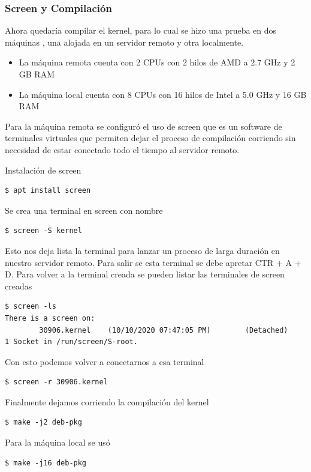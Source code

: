 \documentclass[12pt]{article}
\begin{document}
\subsubsection{Screen y Compilación}
Ahora quedaría compilar el kernel, para lo cual se hizo una prueba en dos máquinas , una alojada en un servidor remoto y otra localmente. 

\begin{itemize}
\item La máquina remota cuenta con 2 CPUs con 2 hilos de AMD a 2.7 GHz y 2 GB RAM 
\item La máquina local cuenta con 8 CPUs  con 16 hilos de Intel a 5.0 GHz y 16 GB RAM
\end{itemize}

Para la máquina remota se configuró el uso de screen que es un software de terminales virtuales que permiten dejar el proceso de compilación corriendo sin necesidad de estar conectado todo el tiempo al servidor remoto.

Instalación de screen
\begin{lstlisting}[frame=single]
$ apt install screen
\end{lstlisting}

Se crea una terminal en screen con nombre
\begin{lstlisting}[frame=single]
$ screen -S kernel
\end{lstlisting}

Esto nos deja lista la terminal para lanzar un proceso de larga duración en nuestro servidor remoto. Para salir se esta terminal se debe apretar CTR + A + D. Para volver a la terminal creada se pueden listar las terminales de screen creadas
\begin{lstlisting}[frame=single]
$ screen -ls
There is a screen on:
        30906.kernel    (10/10/2020 07:47:05 PM)        (Detached)
1 Socket in /run/screen/S-root.
\end{lstlisting}

Con esto podemos volver a conectarnos a esa terminal
\begin{lstlisting}[frame=single]
$ screen -r 30906.kernel
\end{lstlisting}

Finalmente dejamos corriendo la compilación del kernel
 
\begin{lstlisting}[frame=single]
$ make -j2 deb-pkg
\end{lstlisting}


Para la máquina local se usó 
\begin{lstlisting}[frame=single]
$ make -j16 deb-pkg
\end{lstlisting}
\end{document}
